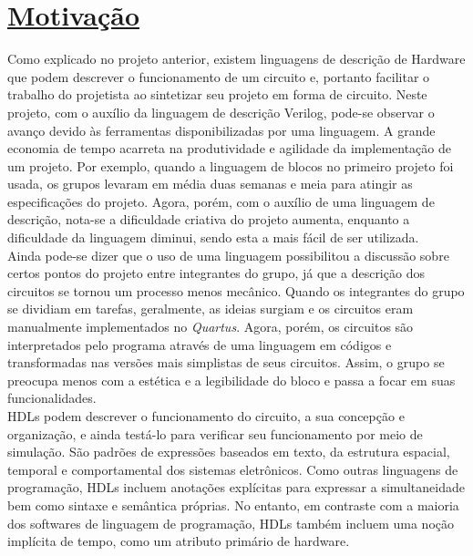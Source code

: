 \documentclass[14pt, oneside]{book}
\newcommand\tab[1][1cm]{\hspace*{#1}}
\theoremstyle{definition}
\begin{document}
        \chapter[Motivação]{\hyperlink{toc}{Motivação}}
            \tab Como explicado no projeto anterior, existem linguagens de descrição de Hardware que podem descrever o funcionamento de um circuito e, portanto facilitar o trabalho do projetista ao sintetizar seu projeto em forma de circuito. Neste projeto, com o auxílio da linguagem de descrição Verilog, pode-se observar o avanço devido às ferramentas disponibilizadas por uma linguagem. A grande economia de tempo acarreta na produtividade e agilidade da implementação de um projeto. Por exemplo, quando a linguagem de blocos no primeiro projeto foi usada, os grupos levaram em média duas semanas e meia para atingir as especificações do projeto. Agora, porém, com o auxílio de uma linguagem de descrição, nota-se a dificuldade criativa do projeto aumenta, enquanto a dificuldade da linguagem diminui, sendo esta a mais fácil de ser utilizada. \\
	        \tab Ainda pode-se dizer que o uso de uma linguagem possibilitou a discussão sobre certos pontos do projeto entre integrantes do grupo, já que a descrição dos circuitos se tornou um processo menos mecânico. Quando os integrantes do grupo se dividiam em tarefas, geralmente, as ideias surgiam e os circuitos eram manualmente implementados no \textit{Quartus}. Agora, porém, os circuitos são interpretados pelo programa através de uma linguagem em códigos e transformadas nas versões mais simplistas de seus circuitos. Assim, o grupo se preocupa menos com a estética e a legibilidade do bloco e passa a focar em suas funcionalidades.\\
	        \tab HDLs podem descrever o funcionamento do circuito, a sua concepção e organização, e ainda testá-lo para verificar seu funcionamento por meio de simulação. São padrões de expressões baseados em texto, da estrutura espacial, temporal e comportamental dos sistemas eletrônicos. Como outras linguagens de programação, HDLs incluem anotações explícitas para expressar a simultaneidade bem como sintaxe e semântica próprias. No entanto, em contraste com a maioria dos softwares de linguagem de programação, HDLs também incluem uma noção implícita de tempo, como um atributo primário de hardware. \\
\end{document}
